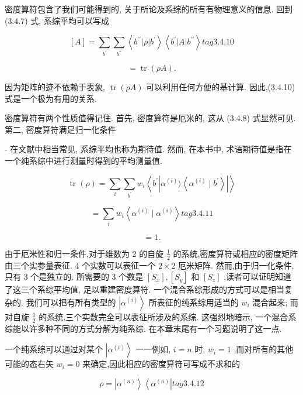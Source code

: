 密度算符包含了我们可能得到的, 关于所论及系综的所有有物理意义的信息. 回到 (3.4.7) 式, 系综平均可以写成

$$
\left\lbrack A\right\rbrack = \mathop{\sum }\limits_{{b}^{\prime }}\mathop{\sum }\limits_{{b}^{\prime \prime }}\left\langle {{b}^{\prime \prime }\left| \rho \right| {b}^{\prime }}\right\rangle \left\langle {{b}^{\prime }\left| A\right| {b}^{\prime \prime }}\right\rangle tag{3. 4. 10}
$$

$$
= \operatorname{tr}\left( {\rho A}\right) \text{.}
$$

因为矩阵的迹不依赖于表象, $\operatorname{tr}\left( {\rho A}\right)$ 可以利用任何方便的基计算. 因此,(3.4.10) 式是一个极为有用的关系.

密度算符有两个性质值得记住. 首先, 密度算符是厄米的, 这从 (3.4.8) 式显然可见. 第二, 密度算符满足归一化条件

- 在文献中相当常见, 系综平均也称为期待值. 然而, 在本书中, 术语期待值是指在一个纯系综中进行测量时得到的平均测量值.

$$
\operatorname{tr}\left( \rho \right) = \mathop{\sum }\limits_{i}\mathop{\sum }\limits_{{b}^{\prime }}{w}_{i}\left\langle {{b}^{\prime }\left| {{\alpha }^{\left( i\right) }\rangle \left\langle {{\alpha }^{\left( i\right) } \mid {b}^{\prime }}\right\rangle }\right| }\right\rangle
$$

$$
= \mathop{\sum }\limits_{i}{w}_{i}\left\langle {{\alpha }^{\left( i\right) } \mid {\alpha }^{\left( i\right) }}\right\rangle tag{3. 4.11}
$$

$$
= 1\text{.}
$$

由于厄米性和归一条件,对于维数为 2 的自旋 $\frac{1}{2}$ 的系统,密度算符或相应的密度矩阵由三个实参量表征. 4 个实数可以表征一个 $2 \times 2$ 厄米矩阵. 然而,由于归一化条件,只有 3 个是独立的. 所需要的 3 个数是 $\left\lbrack {S}_{x}\right\rbrack ,\left\lbrack {S}_{y}\right\rbrack$ 和 $\left\lbrack {S}_{z}\right\rbrack$ ,读者可以证明知道了这三个系综平均值, 足以重建密度算符. 一个混合系综形成的方式可以是相当复杂的. 我们可以把有所有类型的 $\left| {\alpha }^{\left( i\right) }\right\rangle$ 所表征的纯系综用适当的 ${w}_{i}$ 混合起来; 而对自旋 $\frac{1}{2}$ 的系统,三个实数完全可以表征所涉及的系综. 这强烈地暗示, 一个混合系综能以许多种不同的方式分解为纯系综. 在本章末尾有一个习题说明了这一点.

一个纯系综可以通过对某个 $\left| {\alpha }^{\left( i\right) }\right\rangle$ 一一例如, $i = n$ 时, ${w}_{i} = 1$ ,而对所有的其他可能的态右矢 ${w}_{i} = 0$ 来确定,因此相应的密度算符可写成不求和的

$$
\rho = \left| {\alpha }^{\left( n\right) }\right\rangle \left\langle {\alpha }^{\left( n\right) }\right| tag{3. 4.12}
$$

